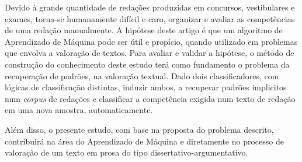 Devido à grande quantidade de redações produzidas em concursos, vestibulares 
e exames, torna-se humanamente difícil e caro, organizar e avaliar as 
competências de uma redação manualmente. A hipótese deste artigo é que um 
algoritmo de Aprendizado de Máquina pode ser útil e propício, quando utilizado 
em problemas que envolva a valoração de textos. Para avaliar e validar a 
hipótese, o método de construção do conhecimento deste estudo terá como 
fundamento o problema da recuperação de padrões, na valoração textual. Dado 
dois classificadores, com lógicas de classificação distintas, induzir ambos, a 
recuperar padrões implicitos num \textit{corpus} de redações e classificar a 
competência exigida num texto de redação em uma nova amostra, automaticamente.

Além disso, o presente estudo, com base na proposta do problema descrito, 
contribuirá na área do Aprendizado de Máquina e diretamente no processo de 
valoração de um texto em prosa do tipo dissertativo-argumentativo.